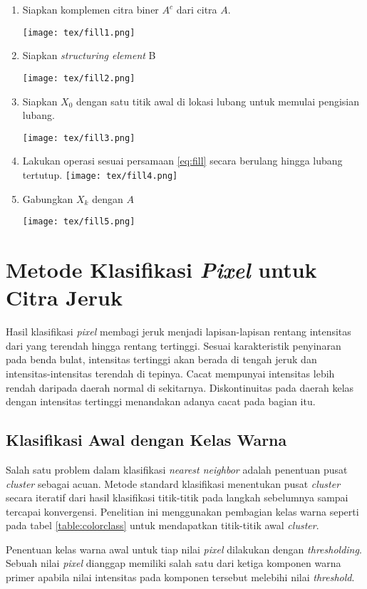 \documentclass[laporan.tex]{subfiles}
\begin{document}
\begin{enumerate}
\item Siapkan komplemen citra biner $A^c$ dari citra $A$.

\texttt{[image: tex/fill1.png]}
\item Siapkan \emph{structuring element} B

\texttt{[image: tex/fill2.png]}
\item Siapkan $X_0$ dengan satu titik awal di lokasi lubang untuk memulai pengisian lubang.

\texttt{[image: tex/fill3.png]}
\item Lakukan operasi sesuai persamaan \ref{eq:fill} secara berulang hingga lubang tertutup.
\texttt{[image: tex/fill4.png]}
\item Gabungkan $X_k$ dengan $A$

\texttt{[image: tex/fill5.png]}
\end{enumerate}

\section{Metode Klasifikasi \emph{Pixel} untuk Citra Jeruk}

Hasil klasifikasi \emph{pixel} membagi jeruk menjadi lapisan-lapisan rentang intensitas dari yang terendah hingga rentang tertinggi. Sesuai karakteristik penyinaran pada benda bulat, intensitas tertinggi akan berada di tengah jeruk dan intensitas-intensitas terendah di tepinya. Cacat mempunyai intensitas lebih rendah daripada daerah normal di sekitarnya. Diskontinuitas pada daerah kelas dengan intensitas tertinggi menandakan adanya cacat pada bagian itu.\cite{liu}

\subsection{Klasifikasi Awal dengan Kelas Warna}
Salah satu problem dalam klasifikasi \emph{nearest neighbor} adalah penentuan pusat \emph{cluster} sebagai acuan. Metode standard klasifikasi menentukan pusat \emph{cluster} secara iteratif dari hasil klasifikasi titik-titik pada langkah sebelumnya sampai tercapai konvergensi. Penelitian ini menggunakan pembagian kelas warna seperti pada tabel \ref{table:colorclass} untuk mendapatkan titik-titik awal \emph{cluster}.

Penentuan kelas warna awal untuk tiap nilai \emph{pixel} dilakukan dengan \emph{thresholding}. Sebuah nilai \emph{pixel} dianggap memiliki salah satu dari ketiga komponen warna primer apabila nilai intensitas pada komponen tersebut melebihi nilai \emph{threshold}.
\end{document}
